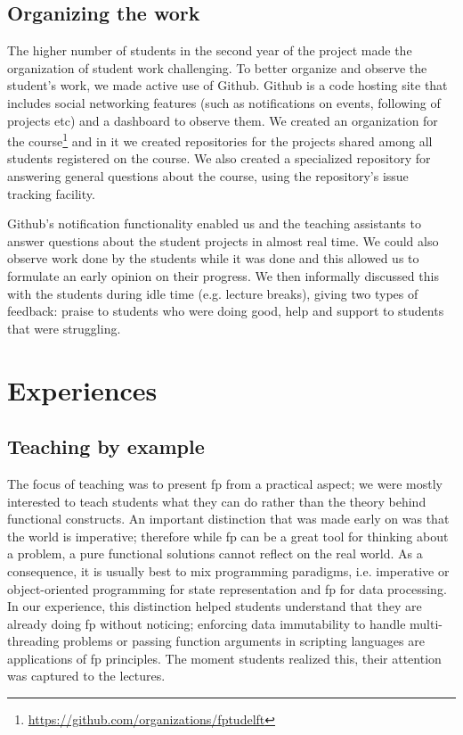 \documentclass[conference]{sig-alternate}
\begin{document}
\subsection{Organizing the work}

The higher number of students in the second year of the project made the
organization of student work challenging. To better organize and observe the
student's work, we made active use of Github. Github is a code hosting site that
includes social networking features (such as notifications on events, following
of projects etc) and a dashboard to observe them. We created an organization for
the course\footnote{\href{https://github.com/organizations/fptudelft}{https://github.com/organizations/fptudelft}} and in it we
created repositories for the projects shared among all students registered on
the course. We also created a specialized repository for answering general
questions about the course, using the repository's issue tracking facility.

Github's notification functionality enabled us and the teaching assistants to
answer questions about the student projects in almost real time. We could also
observe work done by the students while it was done and this allowed us to
formulate an early opinion on their progress. We then informally discussed this with the students during idle time (e.g. lecture breaks), giving two types of feedback: praise to students who were doing good, help and support to students that were struggling. 

\section{Experiences}

\subsection{Teaching by example}

The focus of teaching was to present {\sc fp} from a practical
aspect; we were mostly interested to teach students what they can do rather than
the theory behind functional constructs. An important distinction that was made
early on was that the world is imperative; therefore while {\sc fp} 
 can be a great tool for thinking about a problem, a pure functional
solutions cannot reflect on the real world. As a consequence, it is usually best
to mix programming paradigms, i.e. imperative or object-oriented programming for
state representation and {\sc fp} for data processing. In our
experience, this distinction helped students understand that they are already
doing {\sc fp} without noticing; enforcing data immutability to
handle multi-threading problems or passing function arguments in scripting
languages are applications of {\sc fp} principles. The moment
students realized this, their attention was captured to the lectures.
\end{document}
